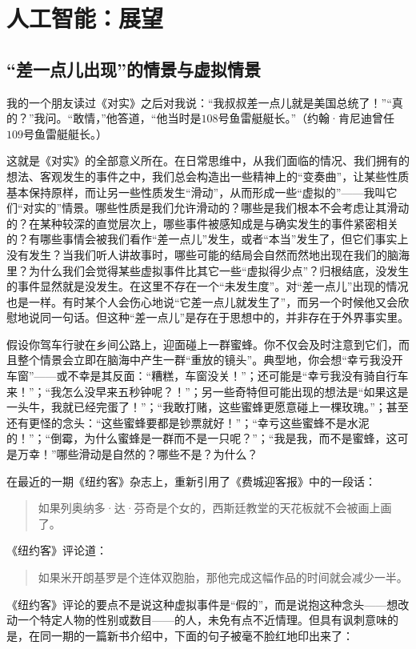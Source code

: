 
\chapter{人工智能：展望}

\section{“差一点儿出现”的情景与虚拟情景}

我的一个朋友读过《对实》之后对我说：“我叔叔差一点儿就是美国总统了！”“真的？”我问。“敢情，”他答道，“他当时是$108$号鱼雷艇艇长。”（约翰·肯尼迪曾任$109$号鱼雷艇艇长。）

这就是《对实》的全部意义所在。在日常思维中，从我们面临的情况、我们拥有的想法、客观发生的事件之中，我们总会构造出一些精神上的“变奏曲”，让某些性质基本保持原样，而让另一些性质发生“滑动”，从而形成一些“虚拟的”——我叫它们“对实的”情景。哪些性质是我们允许滑动的？哪些是我们根本不会考虑让其滑动的？在某种较深的直觉层次上，哪些事件被感知成是与确实发生的事件紧密相关的？有哪些事情会被我们看作“差一点儿”发生，或者“本当”发生了，但它们事实上没有发生？当我们听人讲故事时，哪些可能的结局会自然而然地出现在我们的脑海里？为什么我们会觉得某些虚拟事件比其它一些“虚拟得少点”？归根结底，没发生的事件显然就是没发生。在这里不存在一个“未发生度”。对“差一点儿”出现的情况也是一样。有时某个人会伤心地说“它差一点儿就发生了”，而另一个时候他又会欣慰地说同一句话。但这种“差一点儿”是存在于思想中的，并非存在于外界事实里。

假设你驾车行驶在乡间公路上，迎面碰上一群蜜蜂。你不仅会及时注意到它们，而且整个情景会立即在脑海中产生一群“重放的镜头”。典型地，你会想“幸亏我没开车窗”——或不幸是其反面：“糟糕，车窗没关！”；还可能是“幸亏我没有骑自行车来！”；“我怎么没早来五秒钟呢？！”；另一些奇特但可能出现的想法是“如果这是一头牛，我就已经完蛋了！”；“我敢打赌，这些蜜蜂更愿意碰上一棵玫瑰。”；甚至还有更怪的念头：“这些蜜蜂要都是钞票就好！”；“幸亏这些蜜蜂不是水泥的！”；“倒霉，为什么蜜蜂是一群而不是一只呢？”；“我是我，而不是蜜蜂，这可是万幸！”哪些滑动是自然的？哪些不是？为什么？

在最近的一期《纽约客》杂志上，重新引用了《费城迎客报》中的一段话：

\begin{quote}
如果列奥纳多·达·芬奇是个女的，西斯廷教堂的天花板就不会被画上画了。
\end{quote}
《纽约客》评论道：

\begin{quote}
如果米开朗基罗是个连体双胞胎，那他完成这幅作品的时间就会减少一半。
\end{quote}
《纽约客》评论的要点不是说这种虚拟事件是“假的”，而是说抱这种念头——想改动一个特定人物的性别或数目——的人，未免有点不近情理。但具有讽刺意味的是，在同一期的一篇新书介绍中，下面的句子被毫不脸红地印出来了：

